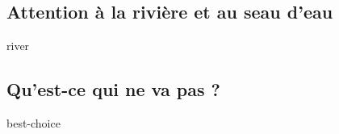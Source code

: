 \subsection{Attention à la rivière et au seau d'eau}

{river}



\subsection{Qu'est-ce qui ne va pas ?}

{best-choice}
